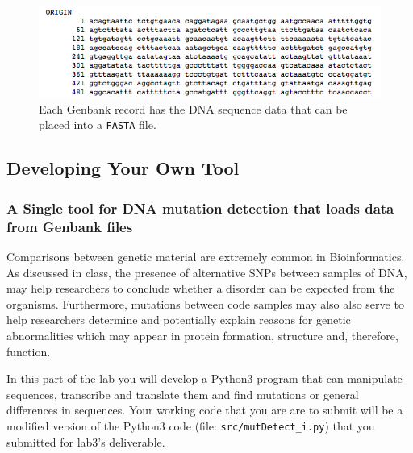 	

\begin{figure}[ht!]
	\begin{center}
	 \includegraphics[scale=.4]{graphics/origin.png}
	\end{center}
	\caption{Each Genbank record has the DNA sequence data that can be placed into a {\tt FASTA} file.}
	\label{fig:origin}
\end{figure}



\vspace*{-.1in}
\subsection*{Developing Your Own Tool}
\vspace*{-.1in} 

	\subsubsection*{A Single tool for DNA mutation detection that loads data from Genbank files}
Comparisons between genetic material are extremely common in Bioinformatics. As discussed in class, the presence of alternative SNPs between samples of DNA, may help researchers to conclude whether a disorder can be expected from the organisms. Furthermore, mutations between code samples may also also serve to help researchers determine and potentially explain reasons for genetic abnormalities which may appear in protein formation, structure and, therefore, function. 

In this part of the lab you will develop a Python3 program that can manipulate sequences, transcribe and translate them and find mutations or general differences in sequences. Your working code that you are are to submit will be a modified version of the Python3 code (file: {\tt src/mutDetect\_i.py}) that you submitted for lab3's deliverable.



